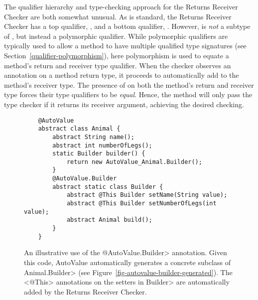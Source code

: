 The qualifier hierarchy and type-checking approach for the Returns Receiver
Checker are both somewhat unusual.  As is standard, the Returns Receiver
Checker has a top qualifier,
, and a bottom qualifier,
.  However, 
is \emph{not} a subtype of ,
but instead a polymorphic qualifier.  While polymorphic qualifiers are typically
used to allow a method to have multiple qualified type signatures (see
Section~\ref{qualifier-polymorphism}), here polymorphism is used to equate a
method's return and receiver type qualifier.  When the checker observes an
 annotation on a method return type,
it proceeds to automatically add  to
the method's receiver type. The presence of
 on both the method's return and
receiver type forces their type qualifiers to be \emph{equal}.  Hence, the
method will only pass the type checker if it returns its receiver argument,
achieving the desired checking.


\begin{figure}
    \begin{Verbatim}
    @AutoValue
    abstract class Animal {
        abstract String name();
        abstract int numberOfLegs();
        static Builder builder() {
            return new AutoValue_Animal.Builder();
        }
        @AutoValue.Builder
        abstract static class Builder {
            abstract @This Builder setName(String value);
            abstract @This Builder setNumberOfLegs(int value);
            abstract Animal build();
        }
    }
    \end{Verbatim}
    \caption{An illustrative use of the \<@AutoValue.Builder> annotation.
    Given this code, AutoValue automatically generates a concrete subclass of
    \<Animal.Builder> (see Figure~\ref{fig-autovalue-builder-generated}).  The <@This> annotations on the setters in
    \<Builder> are automatically added by the Returns Receiver Checker.}
    \label{fig-autovalue-builder}
\end{figure}

